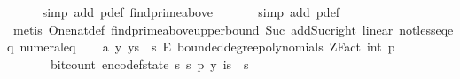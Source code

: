 \begin{isabellebody}
\ \ \ \ \isamarkupfalse%
\ {\isacharparenleft}{\kern0pt}simp\ add{\isacharcolon}{\kern0pt}\ p{\isacharunderscore}{\kern0pt}def\ find{\isacharunderscore}{\kern0pt}prime{\isacharunderscore}{\kern0pt}above{\isacharunderscore}{\kern0pt}{}{\isacharparenright}{\kern0pt}\ \isanewline
\ \ \ \ \isamarkupfalse%
\ {\isacharparenleft}{\kern0pt}simp\ add{\isacharcolon}{\kern0pt}\ p{\isacharunderscore}{\kern0pt}def{\isacharparenright}{\kern0pt}\ \isanewline
\ \ \ \ \isamarkupfalse%
\ {\isacharparenleft}{\kern0pt}metis\ One{\isacharunderscore}{\kern0pt}nat{\isacharunderscore}{\kern0pt}def\ find{\isacharunderscore}{\kern0pt}prime{\isacharunderscore}{\kern0pt}above{\isacharunderscore}{\kern0pt}upper{\isacharunderscore}{\kern0pt}bound\ Suc{\isacharunderscore}{\kern0pt}{}\ add{\isacharunderscore}{\kern0pt}Suc{\isacharunderscore}{\kern0pt}right\ linear\ not{\isacharunderscore}{\kern0pt}less{\isacharunderscore}{\kern0pt}eq{\isacharunderscore}{\kern0pt}eq\ numeral{\isacharunderscore}{\kern0pt}{}{\isacharunderscore}{\kern0pt}eq{\isacharunderscore}{\kern0pt}{}{\isacharparenright}{\kern0pt}\isanewline
\isanewline
\ \ \isamarkupfalse%
\ a{\isacharcolon}{\kern0pt}\ {\isachardoublequoteopen}{\isasymAnd}y{\isachardot}{\kern0pt}\ y{\isasymin}{\isacharbraceleft}{\kern0pt}{}{\isachardot}{\kern0pt}{\isachardot}{\kern0pt}{\isacharless}{\kern0pt}s\ {\isasymtimes}\ {\isacharbraceleft}{\kern0pt}{}{\isachardot}{\kern0pt}{\isachardot}{\kern0pt}{\isacharless}{\kern0pt}s\ {\isasymrightarrow}\isactrlsub E\ bounded{\isacharunderscore}{\kern0pt}degree{\isacharunderscore}{\kern0pt}polynomials\ {\isacharparenleft}{\kern0pt}ZFact\ {\isacharparenleft}{\kern0pt}int\ p{\isacharparenright}{\kern0pt}{\isacharparenright}{\kern0pt}\ {}\ {\isasymLongrightarrow}\isanewline
\ \ \ \ \ \ \ bit{\isacharunderscore}{\kern0pt}count\ {\isacharparenleft}{\kern0pt}encode{\isacharunderscore}{\kern0pt}f{}{\isacharunderscore}{\kern0pt}state\ {\isacharparenleft}{\kern0pt}s\ s\ p{\isacharcomma}{\kern0pt}\ y{\isacharcomma}{\kern0pt}\ {\isasymlambda}i{\isasymin}{\isacharbraceleft}{\kern0pt}{}{\isachardot}{\kern0pt}{\isachardot}{\kern0pt}{\isacharless}{\kern0pt}s\ {\isasymtimes}\ {\isacharbraceleft}{\kern0pt}{}{\isachardot}{\kern0pt}{\isachardot}{\kern0pt}{\isacharless}{\kern0pt}s\ \isanewline

\end{isabellebody}
